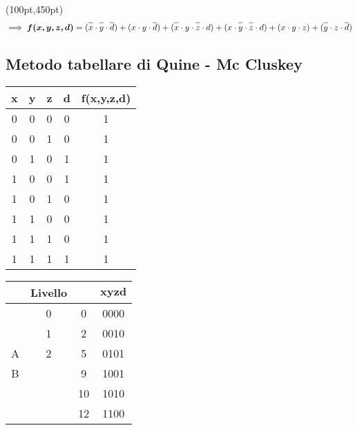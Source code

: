 \documentclass{article}
\def\checkmark{\tikz\fill[scale=0.4](0,.35) -- (.25,0) -- (1,.7) -- (.25,.15) -- cycle;}
\newcommand*{\oline}[1]{\overline{#1\mathstrut}}
\begin{document}
	\begin{textblock*}{10pt}(100pt,450pt)
		\begin{align*}
		\implies \bm{f(x,y,z,d)} = (\oline{x} \cdot \oline{y} \cdot \oline{d}) + (x \cdot y \cdot \oline{d}) + (\oline{x} \cdot y \cdot \oline{z} \cdot d) + (x \cdot \oline{y} \cdot \oline{z} \cdot d) + (x \cdot y \cdot z) + (\oline{y} \cdot z \cdot \oline{d})
		\end{align*}
	\end{textblock*}
\newpage
\subsection*{Metodo tabellare di Quine - Mc Cluskey}
\hspace*{-7em}
\begin{table}[!htb]
	\hspace{-8em}
	\begin{minipage}[t]{0.3\textwidth}
		\begin{tabular}{|c|c|c|c|c|}
			\hline
			\textbf{x} & \textbf{y} & \textbf{z} & \textbf{d} & \textbf{f(x,y,z,d)} \\
			\hline
			0 & 0 & 0 & 0 & 1 \\
			\hline
			0 & 0 & 1 & 0 & 1 \\
			\hline
			0 & 1 & 0 & 1 & 1 \\
			\hline
			1 & 0 & 0 & 1 & 1 \\
			\hline
			1 & 0 & 1 & 0 & 1 \\
			\hline
			1 & 1 & 0 & 0 & 1 \\
			\hline
			1 & 1 & 1 & 0 & 1 \\
			\hline
			1 & 1 & 1 & 1 & 1 \\
			\hline
		\end{tabular}
	\end{minipage}
	\hspace{5.4em}
	\begin{minipage}[t]{0.3\textwidth}
		\def\arraystretch{1.2}
		\begin{tabular}{|c|c|c|c|}
			\hline
			\phantom{\checkmark} & \textbf{Livello} & & \phantom{a}$\bm{xyzd}$\phantom{a} \\
			\hline
			& 0 & 0 & 0000 \\
			\hline
			& 1 & 2 & 0010 \\
			\hline
			A & 2 & 5 & 0101 \\
			B && 9 & 1001 \\
			& & 10 & 1010 \\
			& & 12 & 1100 \\

\end{tabular}
\end{minipage}
\end{table}
\end{document}
